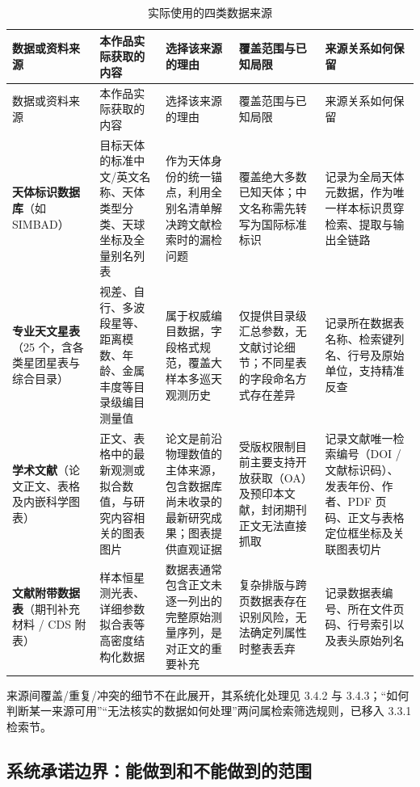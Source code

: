 \begin{longtable}{@{}p{2.7cm}p{3.2cm}p{3.4cm}p{3.2cm}p{2.5cm}@{}}
\caption{实际使用的四类数据来源}\label{tab:sources}\\
\toprule
数据或资料来源 & 本作品实际获取的内容 & 选择该来源的理由 & 覆盖范围与已知局限 & 来源关系如何保留 \\
\midrule
\endfirsthead
\toprule
数据或资料来源 & 本作品实际获取的内容 & 选择该来源的理由 & 覆盖范围与已知局限 & 来源关系如何保留 \\
\midrule
\endhead
\textbf{天体标识数据库}（如 SIMBAD） & 目标天体的标准中文/英文名称、天体类型分类、天球坐标及全量别名列表 & 作为天体身份的统一锚点，利用全别名清单解决跨文献检索时的漏检问题 & 覆盖绝大多数已知天体；中文名称需先转写为国际标准标识 & 记录为全局天体元数据，作为唯一样本标识贯穿检索、提取与输出全链路 \\
\textbf{专业天文星表}（25 个，含各类星团星表与综合目录） & 视差、自行、多波段星等、距离模数、年龄、金属丰度等目录级编目测量值 & 属于权威编目数据，字段格式规范，覆盖大样本多巡天观测历史 & 仅提供目录级汇总参数，无文献讨论细节；不同星表的字段命名方式存在差异 & 记录所在数据表名称、检索键列名、行号及原始单位，支持精准反查 \\
\textbf{学术文献}（论文正文、表格及内嵌科学图表） & 正文、表格中的最新观测或拟合数值，与研究内容相关的图表图片 & 论文是前沿物理数值的主体来源，包含数据库尚未收录的最新研究成果；图表提供直观证据 & 受版权限制目前主要支持开放获取（OA）及预印本文献，封闭期刊正文无法直接抓取 & 记录文献唯一检索编号（DOI / 文献标识码）、发表年份、作者、PDF 页码、正文与表格定位框坐标及关联图表切片 \\
\textbf{文献附带数据表}（期刊补充材料 / CDS 附表） & 样本恒星测光表、详细参数拟合表等高密度结构化数据 & 数据表通常包含正文未逐一列出的完整原始测量序列，是对正文的重要补充 & 复杂排版与跨页数据表存在识别风险，无法确定列属性时整表丢弃 & 记录数据表编号、所在文件页码、行号索引以及表头原始列名 \\
\bottomrule
\end{longtable}

\noindent 来源间覆盖/重复/冲突的细节不在此展开，其系统化处理见 3.4.2 与 3.4.3；“如何判断某一来源可用”“无法核实的数据如何处理”两问属检索筛选规则，已移入 3.3.1 检索节。

\subsection{系统承诺边界：能做到和不能做到的范围}

